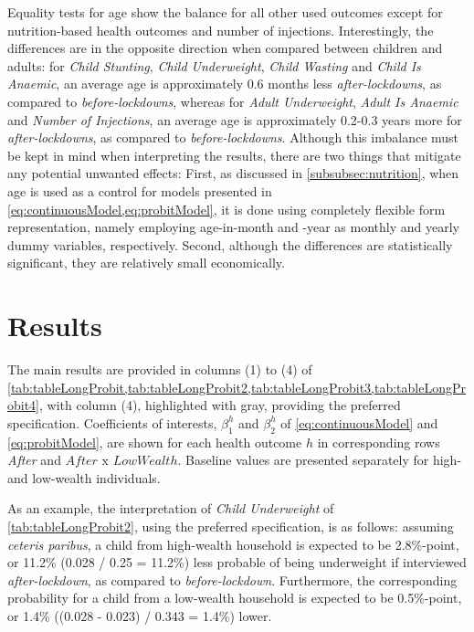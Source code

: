 \documentclass[12pt,a4paper,notitlepage]{article}
\begin{document}
Equality tests for age show the balance for all other used outcomes except for nutrition-based health outcomes and number of injections. Interestingly, the differences are in the opposite direction when compared between children and adults: for \textit{Child Stunting}, \textit{Child Underweight}, \textit{Child Wasting} and \textit{Child Is Anaemic}, an average age is approximately 0.6 months less \textit{after-lockdowns}, as compared to \textit{before-lockdowns}, whereas for \textit{Adult Underweight}, \textit{Adult Is Anaemic} and \textit{Number of Injections}, an average age is approximately 0.2-0.3 years more for \textit{after-lockdowns}, as compared to \textit{before-lockdowns}. Although this imbalance must be kept in mind when interpreting the results, there are two things that mitigate any potential unwanted effects: First, as discussed in \cref{subsubsec:nutrition}, when age is used as a control for models presented in \cref{eq:continuousModel,eq:probitModel}, it is done using completely flexible form representation, namely employing age-in-month and -year as monthly and yearly dummy variables, respectively. Second, although the differences are statistically significant, they are relatively small economically.

\newpage

\section{Results} \label{subsec:results}








The main results are provided in columns (1) to (4) of \cref{tab:tableLongProbit,tab:tableLongProbit2,tab:tableLongProbit3,tab:tableLongProbit4}, with column (4), highlighted with gray, providing the preferred specification. Coefficients of interests, $\beta_1^h$ and $\beta_2^h$ of \cref{eq:continuousModel} and \cref{eq:probitModel}, are shown for each health outcome $h$ in corresponding rows \textit{After} and $After\text{ x }LowWealth$. Baseline values are presented separately for high- and low-wealth individuals.

As an example, the interpretation of \textit{Child Underweight} of \cref{tab:tableLongProbit2}, using the preferred specification, is as follows: assuming \textit{ceteris paribus}, a child from high-wealth household is expected to be 2.8\%-point, or 11.2\% (0.028 / 0.25 = 11.2\%) less probable of being underweight if interviewed \textit{after-lockdown}, as compared to \textit{before-lockdown}. Furthermore, the corresponding probability for a child from a low-wealth household is expected to be 0.5\%-point, or 1.4\% ((0.028 - 0.023) / 0.343 = 1.4\%) lower.
\end{document}
